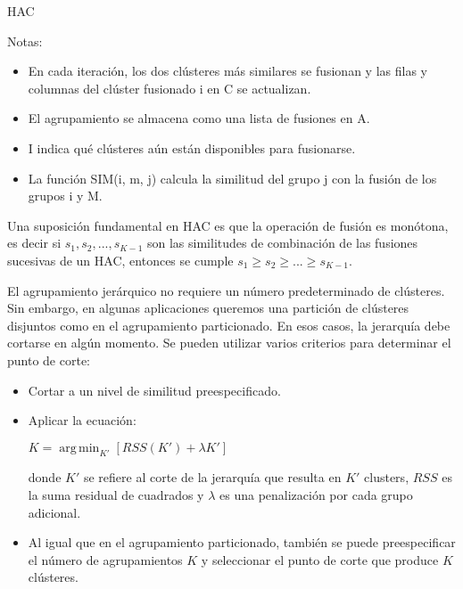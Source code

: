 \documentclass{llncs}
\DeclareMathOperator*{\argmax}{arg\,max}
\DeclareMathOperator*{\argmin}{arg\,min}
\begin{document}
\begin{algorithm}
	\caption{HAC}
	\begin{algorithmic}[1]
		\EndFor
		\EndFor
		\State{$ <i,m> \leftarrow \argmax_{<i,m>:i \neq \wedge I[i] = 1 \wedge I[m] = 1} C[i][m] $}
		\EndFor
		\EndFor
	\end{algorithmic}
\end{algorithm}

Notas: 
\begin{itemize}
	\item En cada iteración, los dos clústeres m\'as similares se fusionan y las filas y columnas del clúster fusionado i en C se actualizan.
	\item El agrupamiento se almacena como una lista de fusiones en A.
	\item I indica qué clústeres aún están disponibles para fusionarse. 
	\item La función SIM(i, m, j) calcula la similitud del grupo j con la fusión de los grupos i y M.
\end{itemize}

Una suposición fundamental en HAC es que la operación de fusión es mon\'otona, es decir si $ s_{1}, s_{2}, . . . , s_{K-1}$ son las similitudes de combinación de las fusiones sucesivas de un HAC, entonces se cumple $ s_{1} \geq s_{2} \geq . . . \geq s_{K-1}$.

El agrupamiento jerárquico no requiere un número predeterminado de clústeres. Sin embargo, en algunas aplicaciones queremos una partición de clústeres disjuntos como en el agrupamiento particionado. En esos casos, la jerarquía debe cortarse en algún momento. Se pueden utilizar varios criterios para determinar el punto de corte:
\begin{itemize}
	\item Cortar a un nivel de similitud preespecificado.
	\item  Aplicar la ecuación:
	\begin{center}
		$K = \argmin_{K'}[RSS(K') + \lambda K'] $
	\end{center}
	donde $ K' $ se refiere al corte de la jerarquía que resulta en $ K' $ clusters, $ RSS $ es la suma residual de cuadrados y $\lambda$ es una penalización por cada grupo adicional.
	\item Al igual que en el agrupamiento particionado, también se puede preespecificar el número de agrupamientos $ K $ y seleccionar el punto de corte que produce $ K $ cl\'usteres.
\end{itemize}
\end{document}
